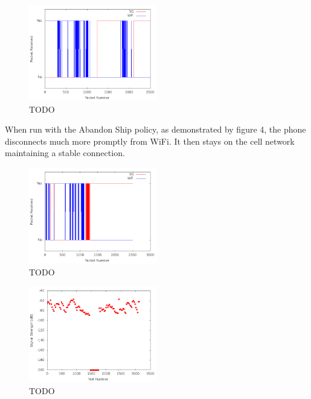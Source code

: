 \begin{figure}
	\includegraphics[width=0.5\textwidth]{leavingCourtyardsNoPolicy}
	\caption{TODO}
\end{figure}

When run with the Abandon Ship policy, as demonstrated by figure 4, the phone disconnects much more promptly from WiFi. It then stays on the cell network maintaining a stable connection. 

\begin{figure}
	\includegraphics[width=0.5\textwidth]{leavingCourtyardsWithPolicy}
	\caption{TODO}
\end{figure}

\begin{figure}
	\includegraphics[width=0.5\textwidth]{sigStrength}
	\caption{TODO}
\end{figure}